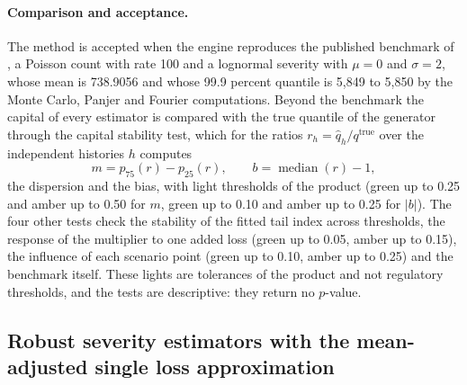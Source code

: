 \paragraph{Comparison and acceptance.} The method is accepted when the engine reproduces the published benchmark of
\citet{oprisk:shevchenko2010}, a Poisson count with rate 100 and a lognormal severity with $\mu=0$ and $\sigma=2$, whose mean is 738.9056 and
whose 99.9 percent quantile is 5,849 to 5,850 by the Monte Carlo, Panjer and Fourier computations. Beyond the benchmark the
capital of every estimator is compared with the true quantile of the generator through the capital stability test, which for the ratios
$r_h=\hat q_h/q^{\mathrm{true}}$ over the independent histories $h$ computes
\begin{equation}
m=p_{75}(r)-p_{25}(r),\qquad b=\operatorname{median}(r)-1,
\label{eq:op-stability}
\end{equation}
the dispersion and the bias, with light thresholds of the product (green up to 0.25 and amber up to 0.50 for $m$, green up to
0.10 and amber up to 0.25 for $|b|$). The four other tests check the stability of the fitted tail index across thresholds, the response of the
multiplier to one added loss (green up to 0.05, amber up to 0.15), the influence of each scenario point (green up to 0.10, amber up to
0.25) and the benchmark itself. These lights are tolerances of the product and not regulatory thresholds, and the tests are descriptive: they
return no $p$-value.

\subsection{Robust severity estimators with the mean-adjusted single loss approximation}
\label{sec:m32}

